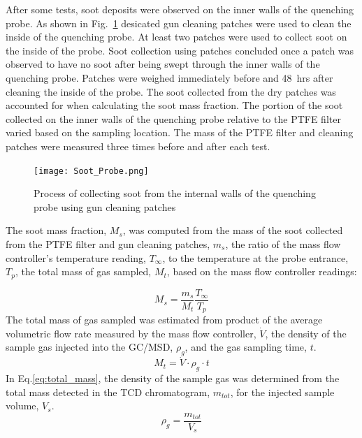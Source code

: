 \documentclass[12pt]{article}
\begin{document}
After some tests, soot deposits were observed on the inner walls of the quenching probe. As shown in Fig.~\ref{fig:Soot_Probe_Setup} desicated gun cleaning patches were used to clean the inside of the quenching probe. At least two patches were used to collect soot on the inside of the probe. Soot collection using patches concluded once a patch was observed to have no soot after being swept through the inner walls of the quenching probe. Patches were weighed immediately before and 48~\si{hrs} after cleaning the inside of the probe. The soot collected from the dry patches was accounted for when calculating the soot mass fraction. The portion of the soot collected on the inner walls of the quenching probe relative to the PTFE filter varied based on the sampling location. The mass of the PTFE filter and cleaning patches were measured three times before and after each test.

\begin{figure}[ht!]
	\centering
\texttt{[image: Soot\_Probe.png]}
	\caption[Process for cleaning soot probe]{Process of collecting soot from the internal walls of the quenching probe using gun cleaning patches}
	\label{fig:Soot_Probe_Setup}
\end{figure}

The soot mass fraction, $M_{s}$, was computed from the mass of the soot collected from the PTFE filter and gun cleaning patches, $m_{s}$, the ratio of the mass flow controller's temperature reading, $T_{\infty}$, to the temperature at the probe entrance,$T_{p}$, the total mass of gas sampled, $M_{t}$, based on the mass flow controller readings:

\begin{equation}\label{eq:soot_mass_frac}
  M_{s}= \frac{m_{s}}{M_{t}}\frac{T_{\infty}}{T_{p}}
\end{equation}
The total mass of gas sampled was estimated from product of the average volumetric flow rate measured by the mass flow controller, $\dot{V}$, the density of the sample gas injected into the GC/MSD, $\rho_{g}$, and the gas sampling time, $t$. 
\begin{equation}\label{eq:total_mass}
M_{t}= \dot{V}\cdot \rho_{g}\cdot t
\end{equation} 
In Eq.\ref{eq:total_mass}, the density of the sample gas was determined from the total mass detected in the TCD chromatogram, $m_{tot}$, for the injected sample volume, $V_{s}$. 
\begin{equation}\label{eq:gas_density}
\rho_{g}= \frac{m_{tot}}{V_{s}}
\end{equation} 
\end{document}
